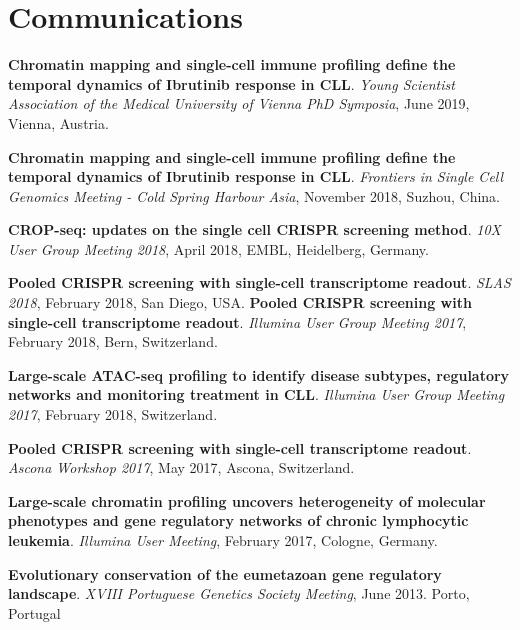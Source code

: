 \documentclass[11pt,a4paper,roman]{moderncv} %
\begin{document}
\section{Communications}
        \begin{etaremune}[leftmargin=1.0cm,itemindent=0pt,topsep=10pt,itemsep=2pt,partopsep=0pt,parsep=0pt]
        \item
        \textbf{Chromatin mapping and single-cell immune profiling define the temporal dynamics of Ibrutinib response in CLL}. \textit{Young Scientist Association of the Medical University of Vienna PhD Symposia}, June 2019, Vienna, Austria.
        \item
        \textbf{Chromatin mapping and single-cell immune profiling define the temporal dynamics of Ibrutinib response in CLL}. \textit{Frontiers in Single Cell Genomics Meeting - Cold Spring Harbour Asia}, November 2018, Suzhou, China.
        \item
        \textbf{CROP-seq: updates on the single cell CRISPR screening method}. \textit{10X User Group Meeting 2018}, April 2018, EMBL, Heidelberg, Germany.
        \item
        \textbf{Pooled CRISPR screening with single-cell transcriptome readout}. \textit{SLAS 2018}, February 2018, San Diego, USA.
        \textbf{Pooled CRISPR screening with single-cell transcriptome readout}. \textit{Illumina User Group Meeting 2017}, February 2018, Bern, Switzerland.
        \item
        \textbf{Large-scale ATAC-seq profiling to identify disease subtypes, regulatory networks and monitoring treatment in CLL}. \textit{Illumina User Group Meeting 2017}, February 2018, Switzerland.
        \item
        \textbf{Pooled CRISPR screening with single-cell transcriptome readout}. \textit{Ascona Workshop 2017}, May 2017, Ascona, Switzerland.
        \item
        \textbf{Large-scale chromatin profiling uncovers heterogeneity of molecular phenotypes and gene regulatory networks of chronic lymphocytic leukemia}. \textit{Illumina User Meeting}, February 2017, Cologne, Germany.
        \item
        \textbf{Evolutionary conservation of the eumetazoan gene regulatory landscape}. \textit{XVIII Portuguese Genetics Society Meeting}, June 2013. Porto, Portugal
        \end{etaremune}
\end{document}
